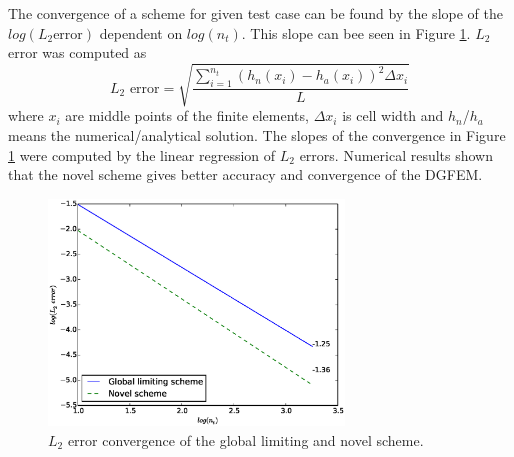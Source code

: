The convergence of a scheme for given test case can be found by the slope of the $log(L_2 \text{error})$ dependent on $log(n_t)$. This slope can bee seen in Figure \ref{L2}. $L_2$ error was computed as
\begin{equation}\label{L2er}
L_2 \text{ error}=\sqrt{\frac{\sum_{i=1}^{n_t} (h_n(x_i)-h_a(x_i))^2 \Delta x_i}{L} }
\end{equation}
where $x_i$ are middle points of the finite elements, $\Delta x_i$ is cell width and $h_{n}$/$h_a$  means the numerical/analytical solution. The slopes of the convergence in Figure \ref{L2} were computed by the linear regression of $L_2$ errors. Numerical results shown that the novel scheme gives better accuracy and convergence of the DGFEM.
\begin{figure}
\centering
\includegraphics[width=0.7\textwidth]{OBR/shockConverg.eps}
\caption{$L_2$ error convergence of the global limiting and novel scheme.}\label{L2}
\end{figure}


